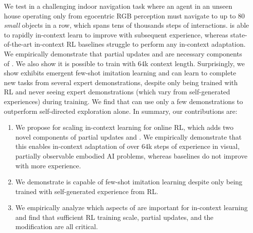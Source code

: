 We test \method in a challenging indoor navigation task where an agent in an unseen house operating only from egocentric RGB perception must navigate to up to 80 \textit{small} objects in a row, which spans tens of thousands steps of interactions. 
\method is able to rapidly in-context learn to improve with subsequent experience, whereas state-of-the-art in-context RL baselines struggle to perform any in-context adaptation.
We empirically demonstrate that partial updates and \sinkv are necessary components of \method. 
We also show it is possible to train \method with 64k context length. 
Surprisingly, we show \method exhibits emergent few-shot imitation learning and can learn to complete new tasks from several expert demonstrations, despite only being trained with RL and never seeing expert demonstrations (which vary from self-generated experiences) during training.
We find that \method can use only a few demonstrations to outperform self-directed exploration alone. In summary, our contributions are:
\begin{enumerate}[itemsep=-0pt,topsep=0pt,parsep=0pt,partopsep=0pt,parsep=0pt,leftmargin=*]
    \item We propose \method for scaling in-context learning for online RL, which adds two novel components of partial updates and \sinkv. 
    We empirically demonstrate that this enables in-context adaptation of over 64k steps of experience in visual, partially observable embodied AI problems, whereas baselines do not improve with more experience.

    \item We demonstrate \method is capable of few-shot imitation learning despite only being trained with self-generated experience from RL.

    \item We empirically analyze which aspects of \method are important for in-context learning and find that sufficient RL training scale, partial updates, and the \sinkv modification are all critical.
\end{enumerate}
